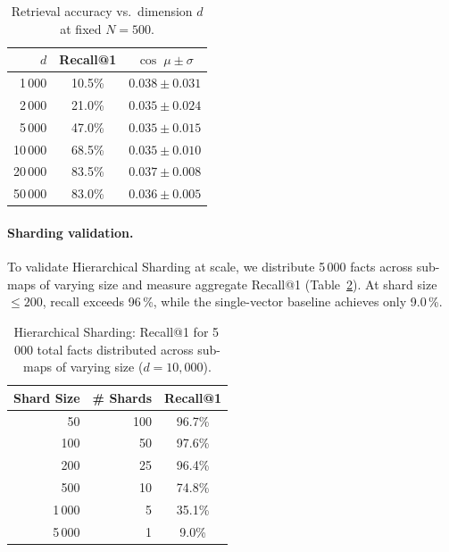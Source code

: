 \documentclass[11pt,a4paper]{article}
\begin{document}
\begin{table}[h]
    \centering
    \caption{Retrieval accuracy vs.\ dimension $d$ at fixed $N = 500$.}
    \label{tab:dim_scaling}
    \begin{tabular}{@{}rcc@{}}
        \toprule
        \textbf{$d$} & \textbf{Recall@1} & \textbf{$\cos \;\mu \pm \sigma$} \\
        \midrule
        1\,000  & 10.5\% & $0.038 \pm 0.031$ \\
        2\,000  & 21.0\% & $0.035 \pm 0.024$ \\
        5\,000  & 47.0\% & $0.035 \pm 0.015$ \\
        10\,000 & 68.5\% & $0.035 \pm 0.010$ \\
        20\,000 & 83.5\% & $0.037 \pm 0.008$ \\
        50\,000 & 83.0\% & $0.036 \pm 0.005$ \\
        \bottomrule
    \end{tabular}
\end{table}

\paragraph{Sharding validation.}
To validate Hierarchical Sharding at scale, we distribute 5\,000 facts
across sub-maps of varying size and measure aggregate Recall@1
(Table~\ref{tab:sharding}).  At shard size~$\leq 200$, recall exceeds
96\,\%, while the single-vector baseline achieves only 9.0\,\%.

\begin{table}[h]
    \centering
    \caption{Hierarchical Sharding: Recall@1 for 5\,000 total facts
    distributed across sub-maps of varying size ($d = 10{,}000$).}
    \label{tab:sharding}
    \begin{tabular}{@{}rrc@{}}
        \toprule
        \textbf{Shard Size} & \textbf{\# Shards} & \textbf{Recall@1} \\
        \midrule
        50    & 100 & 96.7\% \\
        100   &  50 & 97.6\% \\
        200   &  25 & 96.4\% \\
        500   &  10 & 74.8\% \\
        1\,000 &  5 & 35.1\% \\
        5\,000 &  1 &  9.0\% \\
        \bottomrule
    \end{tabular}
\end{table}
\end{document}
